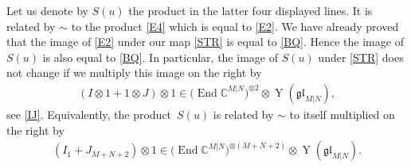 \documentclass[pdftex]{sigma}
\numberwithin{equation}{section}
\def\CC{{\mathbb{C}}}
\def\CMN{\CC^{M|N}}
\def\End{\operatorname{End}}
\def\glMN{\mathfrak{gl}_{M|N}}
\def\ot{\otimes}
\def\YMN{\operatorname{Y}(\glMN)}
\begin{document}
Let us denote by $S(u)$ the product in the latter four displayed lines.
It is related by $\sim$ to the product \eqref{E4} which is equal to \eqref{E2}.
We have already proved that
the image of \eqref{E2} under our map \eqref{STR} is equal to \eqref{BQ}.
Hence the image of $S(u)$ is also equal to \eqref{BQ}.
In particular, the image of $S(u)$ under \eqref{STR}
does not change if we multiply this image on the right by
\begin{gather*}
( I\ot1+1\ot J )\ot1\in
\big(\End\CMN\big)^{\ot 2}\ot\YMN ,
\end{gather*}
see \eqref{IJ}. Equivalently, the product~$S(u)$
is related by $\sim$ to itself multiplied
on the right by
\begin{gather}\label{IJ1}
( I_{1}+J_{M+N+2} )\ot1\in
\big(\End\CMN\big)^{\ot (M+N+2)}\ot\YMN .
\end{gather}
\end{document}
